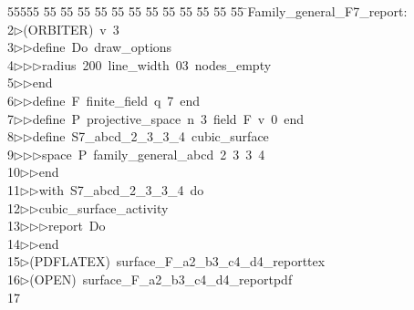 %
%
\begin{tabbing}
55555 \= 55 \= 55 \= 55 \= 55 \= 55 \= 55 \= 55 \= 55 \= 55 \= 55 \= 55 \= 55 \= \>Family\_general\_F7\_report:\\[0pt]
2\>$\triangleright$\>(ORBITER)\ v\ 3\ \\[0pt]
3\>$\triangleright$\>$\triangleright$\>define\ Do\ draw\_options\ \\[0pt]
4\>$\triangleright$\>$\triangleright$\>$\triangleright$\>radius\ 200\ line\_width\ 03\ nodes\_empty\ \\[0pt]
5\>$\triangleright$\>$\triangleright$\>end\ \\[0pt]
6\>$\triangleright$\>$\triangleright$\>define\ F\ finite\_field\ q\ 7\ end\ \\[0pt]
7\>$\triangleright$\>$\triangleright$\>define\ P\ projective\_space\ n\ 3\ field\ F\ v\ 0\ end\ \\[0pt]
8\>$\triangleright$\>$\triangleright$\>define\ S7\_abcd\_2\_3\_3\_4\ cubic\_surface\ \\[0pt]
9\>$\triangleright$\>$\triangleright$\>$\triangleright$\>space\ P\ family\_general\_abcd\ 2\ 3\ 3\ 4\ \\[0pt]
10\>$\triangleright$\>$\triangleright$\>end\ \\[0pt]
11\>$\triangleright$\>$\triangleright$\>with\ S7\_abcd\_2\_3\_3\_4\ do\ \\[0pt]
12\>$\triangleright$\>$\triangleright$\>cubic\_surface\_activity\ \\[0pt]
13\>$\triangleright$\>$\triangleright$\>$\triangleright$\>report\ Do\ \\[0pt]
14\>$\triangleright$\>$\triangleright$\>end\\[0pt]
15\>$\triangleright$\>(PDFLATEX)\ surface\_F\_a2\_b3\_c4\_d4\_reporttex\\[0pt]
16\>$\triangleright$\>(OPEN)\ surface\_F\_a2\_b3\_c4\_d4\_reportpdf\\[0pt]
17\>\end{tabbing}
